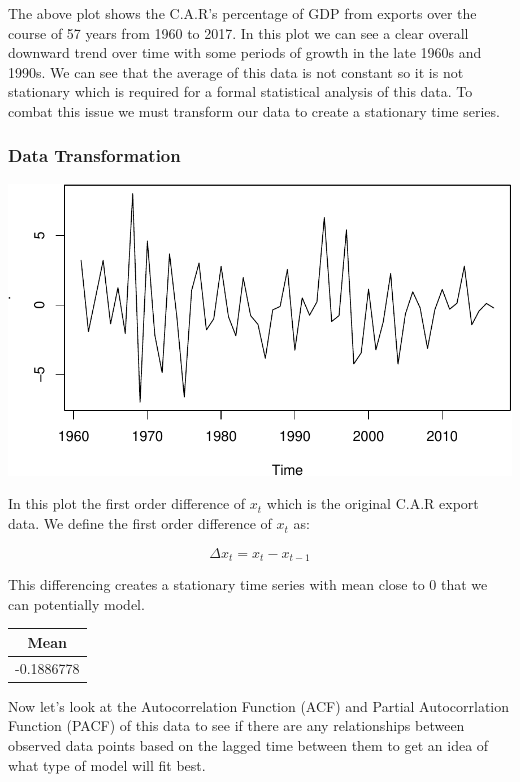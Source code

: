 \documentclass[
]{article}
\begin{document}
The above plot shows the C.A.R's percentage of GDP from exports over the
course of 57 years from 1960 to 2017. In this plot we can see a clear
overall downward trend over time with some periods of growth in the late
1960s and 1990s. We can see that the average of this data is not
constant so it is not stationary which is required for a formal
statistical analysis of this data. To combat this issue we must
transform our data to create a stationary time series.

\hypertarget{data-transformation}{%
\subsubsection{Data Transformation}\label{data-transformation}}

\includegraphics{STA_137_Final_Project_files/figure-latex/unnamed-chunk-3-1.pdf}

In this plot the first order difference of \(x_t\) which is the original
C.A.R export data. We define the first order difference of \(x_t\) as:

\[\Delta x_t = x_t - x_{t-1}\]

This differencing creates a stationary time series with mean close to 0
that we can potentially model.

\begin{center}

\begin{tabular}{c}
\hline
Mean\\
\hline
-0.1886778\\
\hline
\end{tabular}
\end{center}

Now let's look at the Autocorrelation Function (ACF) and Partial
Autocorrlation Function (PACF) of this data to see if there are any
relationships between observed data points based on the lagged time
between them to get an idea of what type of model will fit best.
\end{document}
